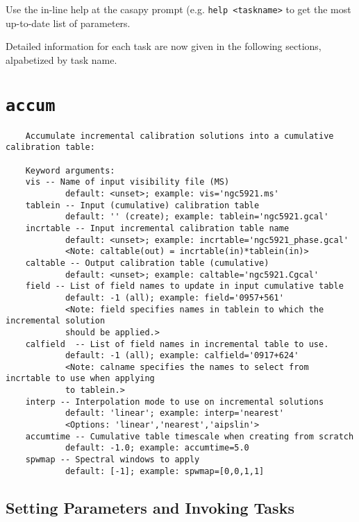 Use the in-line help at the casapy prompt (e.g. {\tt help <taskname>}
to get the most up-to-date list of parameters.

Detailed information for each task are now given in the following
sections, alpabetized by task name.  

\section{{\tt accum}}
\label{section:tasks.accum}

\small
\begin{verbatim}
    Accumulate incremental calibration solutions into a cumulative calibration table:
    
    Keyword arguments:
    vis -- Name of input visibility file (MS)
            default: <unset>; example: vis='ngc5921.ms'
    tablein -- Input (cumulative) calibration table 
            default: '' (create); example: tablein='ngc5921.gcal'
    incrtable -- Input incremental calibration table name
            default: <unset>; example: incrtable='ngc5921_phase.gcal'
            <Note: caltable(out) = incrtable(in)*tablein(in)>
    caltable -- Output calibration table (cumulative)
            default: <unset>; example: caltable='ngc5921.Cgcal'
    field -- List of field names to update in input cumulative table 
            default: -1 (all); example: field='0957+561'
            <Note: field specifies names in tablein to which the incremental solution
            should be applied.>
    calfield  -- List of field names in incremental table to use.
            default: -1 (all); example: calfield='0917+624'
            <Note: calname specifies the names to select from incrtable to use when applying
            to tablein.>
    interp -- Interpolation mode to use on incremental solutions
            default: 'linear'; example: interp='nearest'
            <Options: 'linear','nearest','aipslin'>
    accumtime -- Cumulative table timescale when creating from scratch
            default: -1.0; example: accumtime=5.0
    spwmap -- Spectral windows to apply
            default: [-1]; example: spwmap=[0,0,1,1]
\end{verbatim}
\normalsize

\subsection{Setting Parameters and Invoking Tasks}
\label{section:intro.tasks.setpar}

